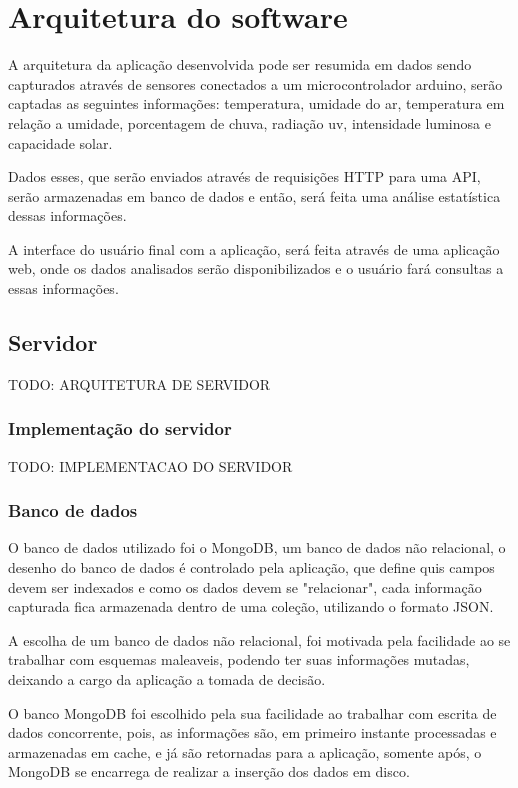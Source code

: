 \section{Arquitetura do software}
\label{sec:arquitetura_software}

A arquitetura da aplicação desenvolvida pode ser resumida em dados sendo capturados através de sensores conectados a um microcontrolador arduino, serão captadas as seguintes informações: temperatura, umidade do ar, temperatura em relação a umidade, porcentagem de chuva, radiação uv, intensidade luminosa e capacidade solar.

Dados esses, que serão enviados através de requisições HTTP para uma API, serão armazenadas em banco de dados e então, será feita uma análise estatística dessas informações.

A interface do usuário final com a aplicação, será feita através de uma aplicação web, onde os dados analisados serão disponibilizados e o usuário fará consultas a essas informações.

\subsection{Servidor}

TODO: ARQUITETURA DE SERVIDOR

\subsubsection{Implementação do servidor}

TODO: IMPLEMENTACAO DO SERVIDOR

\subsubsection{Banco de dados}

O banco de dados utilizado foi o MongoDB, um banco de dados não relacional, o desenho do banco de dados é controlado pela aplicação, que define quis campos devem ser indexados e como os dados devem se "relacionar", cada informação capturada fica armazenada dentro de uma coleção, utilizando o formato JSON.

A escolha de um banco de dados não relacional, foi motivada pela facilidade ao se trabalhar com esquemas maleaveis, podendo ter suas informações mutadas, deixando a cargo da aplicação a tomada de decisão.

O banco MongoDB foi escolhido pela sua facilidade ao trabalhar com escrita de dados concorrente, pois, as informações são, em primeiro instante processadas e armazenadas em cache, e já são retornadas para a aplicação, somente após, o MongoDB se encarrega de realizar a inserção dos dados em disco.


